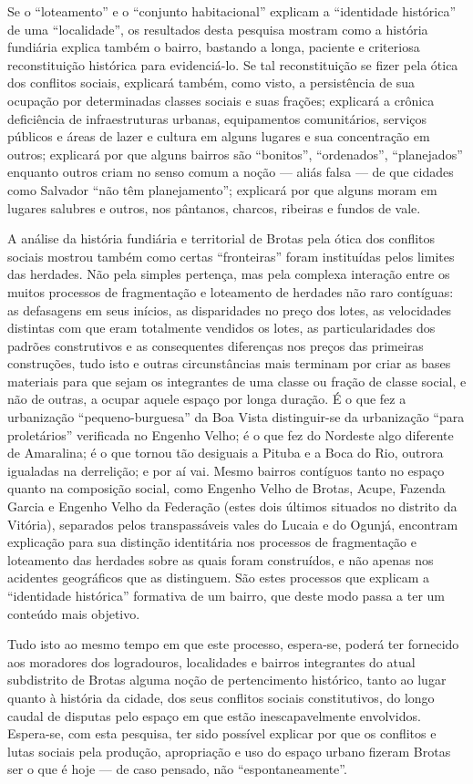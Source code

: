 Se o ``loteamento'' e o ``conjunto habitacional'' explicam a ``identidade histórica'' de uma ``localidade'', os resultados desta pesquisa mostram como a história fundiária explica também o bairro, bastando a longa, paciente e criteriosa reconstituição histórica para evidenciá-lo. Se tal reconstituição se fizer pela ótica dos conflitos sociais, explicará também, como visto, a persistência de sua ocupação por determinadas classes sociais e suas frações; explicará a crônica deficiência de infraestruturas urbanas, equipamentos comunitários, serviços públicos e áreas de lazer e cultura em alguns lugares e sua concentração em outros; explicará por que alguns bairros são ``bonitos'', ``ordenados'', ``planejados'' enquanto outros criam no senso comum a noção --- aliás falsa --- de que cidades como Salvador ``não têm planejamento''; explicará por que alguns moram em lugares salubres e outros, nos pântanos, charcos, ribeiras e fundos de vale.

A análise da história fundiária e territorial de Brotas pela ótica dos conflitos sociais mostrou também como certas ``fronteiras'' foram instituídas pelos limites das herdades. Não pela simples pertença, mas pela complexa interação entre os muitos processos de fragmentação e loteamento de herdades não raro contíguas: as defasagens em seus inícios, as disparidades no preço dos lotes, as velocidades distintas com que eram totalmente vendidos os lotes, as particularidades dos padrões construtivos e as consequentes diferenças nos preços das primeiras construções, tudo isto e outras circunstâncias mais terminam por criar as bases materiais para que sejam os integrantes de uma classe ou fração de classe social, e não de outras, a ocupar aquele espaço por longa duração. É o que fez a urbanização ``pequeno-burguesa'' da Boa Vista distinguir-se da urbanização ``para proletários'' verificada no Engenho Velho; é o que fez do Nordeste algo diferente de Amaralina; é o que tornou tão desiguais a Pituba e a Boca do Rio, outrora igualadas na derrelição; e por aí vai. Mesmo bairros contíguos tanto no espaço quanto na composição social, como Engenho Velho de Brotas, Acupe, Fazenda Garcia e Engenho Velho da Federação (estes dois últimos situados no distrito da Vitória), separados pelos transpassáveis vales do Lucaia e do Ogunjá, encontram explicação para sua distinção identitária nos processos de fragmentação e loteamento das herdades sobre as quais foram construídos, e não apenas nos acidentes geográficos que as distinguem. São estes processos que explicam a ``identidade histórica'' formativa de um bairro, que deste modo passa a ter um conteúdo mais objetivo.

Tudo isto ao mesmo tempo em que este processo, espera-se, poderá ter fornecido aos moradores dos logradouros, localidades e bairros integrantes do atual subdistrito de Brotas alguma noção de pertencimento histórico, tanto ao lugar quanto à história da cidade, dos seus conflitos sociais constitutivos, do longo caudal de disputas pelo espaço em que estão inescapavelmente envolvidos. Espera-se, com esta pesquisa, ter sido possível explicar por que os conflitos e lutas sociais pela produção, apropriação e uso do espaço urbano fizeram Brotas ser o que é hoje --- de caso pensado, não ``espontaneamente''.